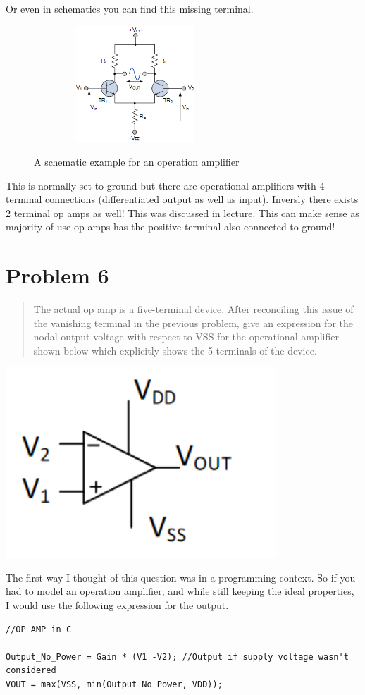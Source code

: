 \documentclass[10pt,a4paper]{article}
\begin{document}
Or even in schematics you can find this missing terminal. \\

\begin{figure}[H]
\centering
\includegraphics[width=2.99028in,height=1.71667in]{images/opamp-opamp52.png}\\
\caption{A schematic example for an operation amplifier\cite{opamp-pics}}
\end{figure}

This is normally set to ground but there are operational amplifiers with 4 terminal connections (differentiated output as well as input). Inversly there exists 2 terminal op amps as well! This was discussed in lecture. This can make sense as majority of use op amps has the positive terminal also connected to ground!


\section{Problem 6}
\begin{quote}
The actual op amp is a five-terminal device. After reconciling
this issue of the vanishing terminal in the previous problem, give an
expression for the nodal output voltage with respect to VSS for the
operational amplifier shown below which explicitly shows the 5 terminals
of the device.
\end{quote}
\begin{center}
\includegraphics[width=4in]{images/problem6.png}\\
\end{center}
The first way I thought of this question was in a programming context. So if you had to model an operation amplifier, and while still keeping the ideal properties, I would use the following expression for the output.
\begin{lstlisting}
//OP AMP in C

Output_No_Power = Gain * (V1 -V2); //Output if supply voltage wasn't considered
VOUT = max(VSS, min(Output_No_Power, VDD));

\end{lstlisting}
\end{document}
